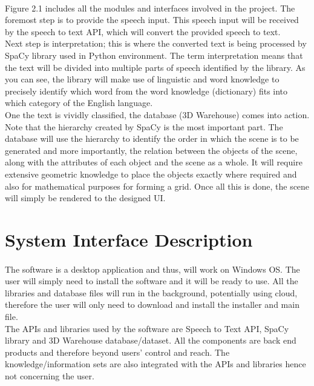 \documentclass[12pt,a4paper,final,oneside]{report}
\begin{document}
\paragraph{}
Figure 2.1 includes all the modules and interfaces involved in the project. The foremost step is to provide the speech input. This speech input will be received by the speech to text API, which will convert the provided speech to text.\\ Next step is interpretation; this is where the converted text is being processed by SpaCy library used in Python environment. The term interpretation means that the text will be divided into multiple parts of speech identified by the library. As you can see, the library will make use of linguistic and word knowledge to precisely identify which word from the word knowledge (dictionary) fits into which category of the English language. \\ One the text is vividly classified, the database (3D Warehouse) comes into action. Note that the hierarchy created by SpaCy is the most important part. The database will use the hierarchy to identify the order in which the scene is to be generated and more importantly, the relation between the objects of the scene, along with the attributes of each object and the scene as a whole. It will require extensive geometric knowledge to place the objects exactly where required and also for mathematical purposes for forming a grid. Once all this is done, the scene will simply be rendered to the designed UI.


\section{  System Interface Description }
\paragraph{}
The software is a desktop application and thus, will work on Windows OS. The user will simply need to install the software and it will be ready to use. All the libraries and database files will run in the background, potentially using cloud, therefore the user will only need to download and install the installer and main file.\\
The APIs and libraries used by the software are Speech to Text API, SpaCy library and 3D Warehouse database/dataset. All the components are back end products and therefore beyond users’ control and reach. The knowledge/information sets are also integrated with the APIs and libraries hence not concerning the user.
\end{document}
